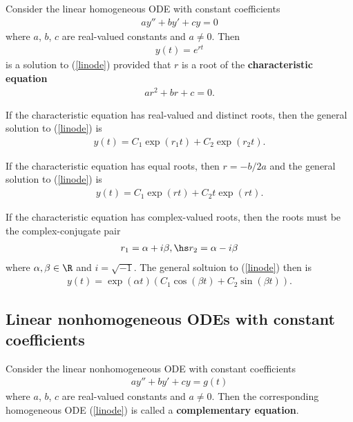 \documentclass{article}
\begin{document}
\begin{theorem}
	Consider the linear homogeneous ODE with constant coefficients
	\begin{align}
		\label{linode}
		ay'' + by' + cy = 0
	\end{align}
	where $a$, $b$, $c$ are real-valued constants and $a\not=0$.
	Then
	\begin{align*}
		y(t)=e^{rt}
	\end{align*}
	is a solution to (\ref{linode}) provided that $r$ is a root of the
	\textbf{characteristic equation}
	\begin{align*}
		ar^2 + br + c = 0.
	\end{align*}
\end{theorem}
\begin{theorem}
	If the characteristic equation has real-valued and distinct roots,
	then the general solution to (\ref{linode}) is
	\begin{align*}
		y(t)=C_1\exp(r_1 t) + C_2 \exp(r_2 t).
	\end{align*}
\end{theorem}
\begin{theorem}
	If the characteristic equation has equal roots, then $r=-b/2a$ and the
	general solution to (\ref{linode}) is
	\begin{align*}
		y(t)=C_1\exp\left(rt\right)+C_2t\exp(rt).
	\end{align*}
\end{theorem}
\begin{theorem}
	If the characteristic equation has complex-valued roots, then the
	roots must be the complex-conjugate pair
	\begin{align*}
		r_1 = \alpha + i\beta,\hs r_2 = \alpha - i\beta
	\end{align*}
	where $\alpha,\beta\in\R$ and $i=\sqrt{-1}$. The general soltuion
	to (\ref{linode}) then is
	\begin{align*}
		y(t) = \exp(\alpha t)\left(C_1 \cos\left(\beta t\right)+C_2\sin\left(\beta t\right)\right).
	\end{align*}
\end{theorem}


\subsection{Linear nonhomogeneous ODEs with constant coefficients}


\begin{definition}
	Consider the linear nonhomogeneous ODE with constant coefficients
	\begin{align}
		\label{linoden}
		ay'' + by' + cy = g(t)
	\end{align}
	where $a$, $b$, $c$ are real-valued constants and $a\not=0$. Then
	the corresponding homogeneous ODE (\ref{linode}) is called a
	\textbf{complementary equation}.
\end{definition}
\end{document}
